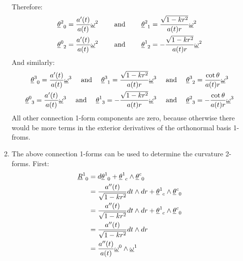 \documentclass[12pt,a4]{article}
\begin{document}
\begin{enumerate}
\begin{align*}
    \end{align*}
    Therefore:
    \begin{align*}
      \tensor{\underline{\theta}}{^2_0} = \frac{a'(t)}{a(t)} \underline{\omega}^2 \qquad &\text{ and } \qquad \tensor{\underline{\theta}}{^2_1} = \frac{\sqrt{1 - k r^2}}{a(t)r} \underline{\omega}^2\\
      \tensor{\underline{\theta}}{^0_2} = \frac{a'(t)}{a(t)} \underline{\omega}^2 \qquad &\text{ and } \qquad \tensor{\underline{\theta}}{^1_2} = -\frac{\sqrt{1 - k r^2}}{a(t)r} \underline{\omega}^2\\
    \end{align*}
    And similarly:
    \begin{gather*}
      \tensor{\underline{\theta}}{^3_0} = \frac{a'(t)}{a(t)} \underline{\omega}^3 \quad \text{ and } \quad \tensor{\underline{\theta}}{^3_1} = \frac{\sqrt{1 - k r^2}}{a(t) r}  \underline{\omega}^3 \quad \text{ and } \quad \tensor{\underline{\theta}}{^3_2} = \frac{\cot \theta }{a(t)r} \underline{\omega}^3 \\
      \tensor{\underline{\theta}}{^0_3} = \frac{a'(t)}{a(t)} \underline{\omega}^3 \quad \text{ and } \quad \tensor{\underline{\theta}}{^1_3} = -\frac{\sqrt{1 - k r^2}}{a(t) r} \underline{\omega}^3 \quad \text{ and } \quad \tensor{\underline{\theta}}{^2_3} = -\frac{\cot \theta }{a(t)r} \underline{\omega}^3 
    \end{gather*}
    All other connection 1-form components are zero, because otherwise there would be more terms in the exterior derivatives of the orthonormal basis 1-froms.
  \item
    The above connection 1-forms can be used to determine the curvature 2-forms.
    First:
    \begin{align*}
      \tensor{\underline{R}}{^1_0} &= d \tensor{\underline{\theta}}{^1_0} + \tensor{\underline{\theta}}{^1_c} \wedge \tensor{\underline{\theta}}{^c_0}\\
                                   &= \frac{a''(t)}{\sqrt{1 - k r^2}} dt \wedge dr + \tensor{\underline{\theta}}{^1_c} \wedge \tensor{\underline{\theta}}{^c_0}\\
                                   &= \frac{a''(t)}{\sqrt{1 - k r^2}} dt \wedge dr + \tensor{\underline{\theta}}{^1_c} \wedge \tensor{\underline{\theta}}{^c_0}\\
                                   &= \frac{a''(t)}{\sqrt{1 - k r^2}} dt \wedge dr\\
                                   &= \frac{a''(t)}{a(t)} \underline{\omega}^0 \wedge \underline{\omega}^1

\end{align*}
\end{enumerate}
\end{document}
